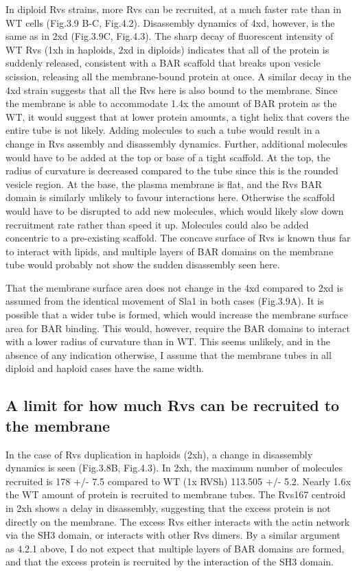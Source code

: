 {In diploid Rvs strains, more Rvs can be recruited, at a much faster rate than in WT cells (Fig.3.9 B-C, Fig.4.2). Disassembly dynamics of 4xd, however, is the same as in 2xd (Fig.3.9C, Fig.4.3). The sharp decay of fluorescent intensity of WT Rvs (1xh in haploids, 2xd in diploids) indicates that all of the protein is suddenly released, consistent with a BAR scaffold that breaks upon vesicle scission, releasing all the membrane-bound protein at once. A similar decay in the 4xd strain suggests that all the Rvs here is also bound to the membrane. Since the membrane is able to accommodate 1.4x the amount of BAR protein as the WT, it would suggest that at lower protein amounts, a tight helix that covers the entire tube is not likely. Adding molecules to such a tube would result in a change in Rvs assembly and disassembly dynamics. Further, additional molecules would have to be added at the top or base of a tight scaffold. At the top, the radius of curvature is decreased compared to the tube since this is the rounded vesicle region. At the base, the plasma membrane is flat, and the Rvs BAR domain is similarly unlikely to favour interactions here. Otherwise the scaffold would have to be disrupted to add new molecules, which would likely slow down recruitment rate rather than speed it up. Molecules could also be added concentric to a pre-existing scaffold. The concave surface of Rvs is known thus far to interact with lipids, and multiple layers of BAR domains on the membrane tube would probably not show the sudden disassembly seen here.  

That the membrane surface area does not change in the 4xd compared to 2xd is assumed from the identical movement of Sla1 in both cases (Fig.3.9A). It is possible that a wider tube is formed, which would increase the membrane surface area for BAR binding. This would, however, require the BAR domains to interact with a lower radius of curvature than in WT. This seems unlikely, and in the absence of any indication otherwise, I assume that the membrane tubes in all diploid and haploid cases have the same width.

\subsection{A limit for how much Rvs can be recruited to the membrane}
In the case of Rvs duplication in haploids (2xh), a change in disassembly dynamics is seen (Fig.3.8B, Fig.4.3). In 2xh, the maximum number of molecules recruited is 178 +/- 7.5 compared to WT (1x RVSh) 113.505 +/- 5.2. Nearly 1.6x the WT amount of protein is recruited to membrane tubes. The Rvs167 centroid in 2xh shows a delay in disassembly, suggesting that the excess protein is not directly on the membrane. The excess Rvs either interacts with the actin network via the SH3 domain, or interacts with other Rvs dimers. By a similar argument as 4.2.1 above, I do not expect that multiple layers of BAR domains are formed, and that the excess protein is recruited by the interaction of the SH3 domain.   

}

